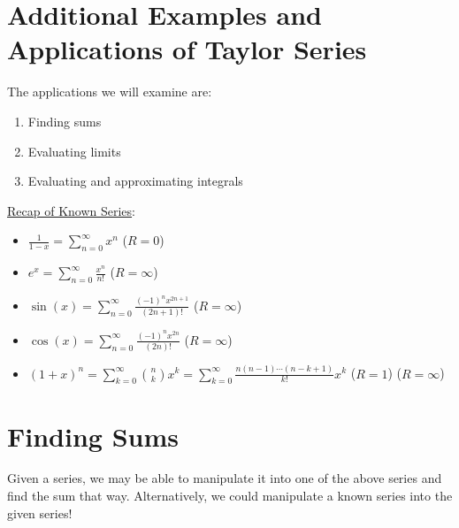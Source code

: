 \section{Additional Examples and Applications of Taylor Series}
The applications we will examine are:
\begin{enumerate}
    \item Finding sums
    \item Evaluating limits
    \item Evaluating and approximating integrals
\end{enumerate}
\underline{Recap of Known Series}:
\begin{itemize}
    \item $ \displaystyle \frac{1}{1-x} =\sum\limits_{n=0}^{\infty} x^n $ ($ R=0 $)
    \item $ \displaystyle e^x=\sum\limits_{n=0}^{\infty} \frac{x^n}{n!}  $ ($ R=\infty $)
    \item $ \displaystyle \sin(x)=\sum\limits_{n=0}^\infty \frac{(-1)^n x^{2n+1}}{(2n+1)!} $
          ($ R=\infty $)
    \item $ \displaystyle \cos(x)=\sum\limits_{n=0}^\infty \frac{(-1)^n x^{2n}}{(2n)!} $
          ($ R=\infty $)
    \item $ \displaystyle (1+x)^n=\sum\limits_{k=0}^{\infty}\binom{n}{k}x^k
              =\sum\limits_{k=0}^{\infty} \frac{n(n-1)\cdots(n-k+1)}{k!} x^k  $ ($ R=1 $)
          ($ R=\infty $)
\end{itemize}


\section*{Finding Sums}
Given a series, we may be able to manipulate
it into one of the above series and find the sum that way. Alternatively, we could
manipulate a known series into the given series!

